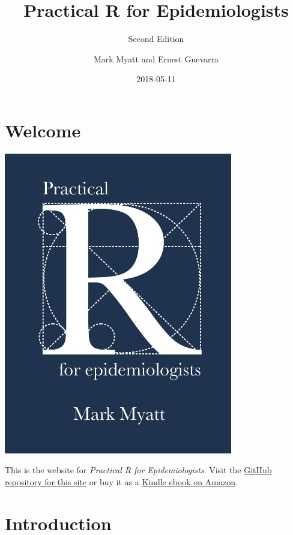 \documentclass[12pt,a4paper]{book}
\title{Practical R for Epidemiologists}
\subtitle{Second Edition}
\author{Mark Myatt and Ernest Guevarra}
\date{2018-05-11}
\theoremstyle{definition}
\theoremstyle{definition}
\theoremstyle{definition}
\theoremstyle{remark}
\begin{document}
\maketitle

{
\hypersetup{linkcolor=black}
\setcounter{tocdepth}{1}
\tableofcontents
}
\hypertarget{welcome}{%
\chapter*{Welcome}\label{welcome}}

\includegraphics{images/bookcover.jpg}

This is the website for \emph{Practical R for Epidemiologists}. Visit
the
\href{https://github.com/ernestguevarra/practical-r-for-epidemiologists}{GitHub
repository for this site} or buy it as a
\href{https://www.amazon.co.uk/Practical-R-Epidemiologists-Mark-Myatt-ebook/dp/B00DQATKIE/ref=sr_1_1?ie=UTF8\&qid=1524423427\&sr=8-1\&keywords=practical+r+for+epidemiologists}{Kindle
ebook on Amazon}.

\hypertarget{introduction}{%
\chapter*{Introduction}\label{introduction}}
\end{document}
